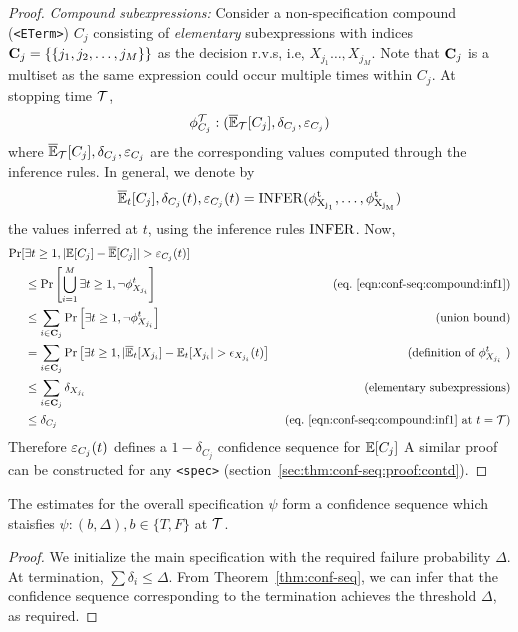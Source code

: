 \begin{proof}
\noindent \textit{Compound subexpressions:} 
Consider a non-specification compound (\texttt{<ETerm>}) $C_j$ consisting of \textit{elementary} subexpressions with indices ${\mathbf{C}}_j = \{\{j_1, j_2, \dots, j_{M}\}\}$ as the decision r.v.s, i.e, $X_{j_1} \dots, X_{j_{M}}$.
Note that ${\mathbf{C}}_j$ is a multiset as the same expression could occur multiple times within $C_j$. 
At stopping time ${\mathcal{T}}$, 
\begin{equation}
    \phi_{C_j}^{\mathcal{T}}: (\overline{\mathbb{E}}_{\mathcal{T}}[C_j], \delta_{C_j}, \varepsilon_{C_j})
\end{equation}
where $\overline{\mathbb{E}}_{\mathcal{T}}[C_j], \delta_{C_j}, \varepsilon_{C_j}$ are the corresponding values computed through the inference rules.
In general, we denote by 
\begin{equation}
\overline{\mathbb{E}}_t[C_j], \delta_{C_j}(t), \varepsilon_{C_j}(t) = \rm{INFER}(\phi^t_{X_{j_1}}, \dots, \phi^t_{X_{j_M}})
\label{eqn:conf-seq:compound:inf1}
\end{equation}
the values inferred at $t$, using the inference rules $\rm{INFER}$. 
Now,
\begin{align*}
    \Pr[&\exists t \geq 1, |\mathbb{E}[C_j] - \overline{\mathbb{E}}[C_j]| > \varepsilon_{C_j}(t)] & \\
        &\leq \Pr\left[\bigcup\limits_{i = 1}^{M} \exists t \geq 1,  \neg \phi_{X_{j_i}}^t \right] & \text{ (eq.~\ref{eqn:conf-seq:compound:inf1})} \\
      &\leq \sum\limits_{i\in {\mathbf{C}}_j}\Pr\left[\exists t \geq 1, \neg \phi^t_{X_{j_i}}\right]  & \text{ (union bound)} \\
      &= \sum\limits_{i\in {\mathbf{C}}_j}\Pr\left[\exists t \geq 1, |\overline{\mathbb{E}}_t[X_{j_i}] - \mathbb{E}_t[X_{j_i}| > \epsilon_{X_{j_i}}(t)\right] &\text{(definition of $\phi^t_{X_{j_i}}$ )} \\
      &\leq \sum\limits_{i\in {\mathbf{C}}_j} \delta_{X_{j_i}} &  \text{ (elementary subexpressions)} \\
      &\leq \delta_{C_j} & \text{ (eq.~\ref{eqn:conf-seq:compound:inf1} at $t = {\mathcal{T}}$)}
\end{align*}
Therefore $\varepsilon_{C_j}(t)$ defines a $1 - \delta_{C_j}$ confidence sequence for $\mathbb{E}[C_j]$
A similar proof can be constructed for any \texttt{<spec>} (section~\ref{sec:thm:conf-seq:proof:contd}).
\end{proof}

\begin{corollary}
The estimates for the overall specification $\psi$ form a confidence sequence which staisfies $\psi: (b, \Delta), b \in \{T, F\}$ at ${\mathcal{T}}$.
\end{corollary}
\begin{proof}
We initialize the main specification with the required failure probability $\Delta$. 
At termination, $\sum \delta_i \leq \Delta$.
From Theorem~\ref{thm:conf-seq}, we can infer that the confidence sequence corresponding to the termination achieves the threshold $\Delta$, as required.
\end{proof}


